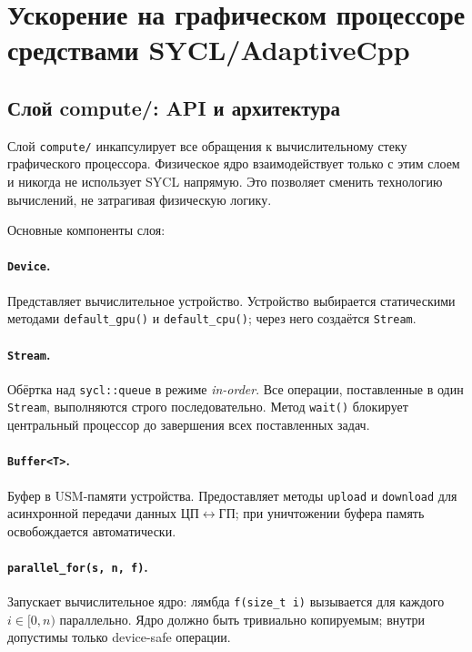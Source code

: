 \section{Ускорение на графическом процессоре средствами SYCL/AdaptiveCpp}

\subsection{Слой compute/: API и архитектура}

Слой \texttt{compute/} инкапсулирует все обращения к вычислительному стеку графического процессора. Физическое ядро взаимодействует только с этим
слоем и никогда не использует SYCL напрямую. Это позволяет сменить технологию вычислений, не затрагивая физическую 
логику.

Основные компоненты слоя:

\paragraph{\texttt{Device}.} Представляет вычислительное устройство. Устройство выбирается статическими 
методами \texttt{default\_gpu()} и \texttt{default\_cpu()}; через него создаётся \texttt{Stream}.

\paragraph{\texttt{Stream}.} Обёртка над \texttt{sycl::queue} в режиме \textit{in-order}. Все операции, 
поставленные в один \texttt{Stream}, выполняются строго последовательно. Метод \texttt{wait()} блокирует центральный процессор
до завершения всех поставленных задач.

\paragraph{\texttt{Buffer<T>}.} Буфер в USM-памяти устройства. Предоставляет методы \texttt{upload} и 
\texttt{download} для асинхронной передачи данных ЦП$\leftrightarrow$ГП; при уничтожении буфера память 
освобождается автоматически.

\paragraph{\texttt{parallel\_for(s, n, f)}.}
Запускает вычислительное ядро: лямбда \texttt{f(size\_t i)} вызывается
для каждого $i \in [0, n)$ параллельно.
Ядро должно быть тривиально копируемым; внутри допустимы только device-safe операции.

